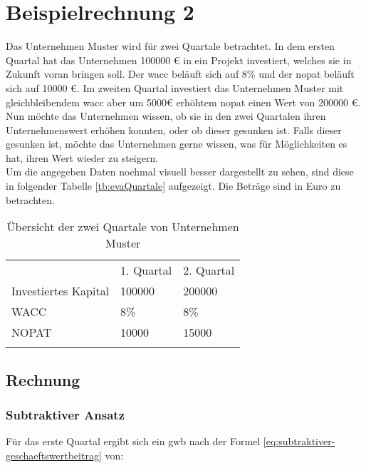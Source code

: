 \section{Beispielrechnung 2}

Das Unternehmen Muster wird für zwei Quartale betrachtet. In dem ersten Quartal hat das Unternehmen 100000 € in ein Projekt investiert, welches sie in Zukunft voran bringen soll. Der \ac{wacc} beläuft sich auf 8\% und der \ac{nopat} beläuft sich auf 10000 €. Im zweiten Quartal investiert das Unternehmen Muster mit gleichbleibendem \ac{wacc} aber um 5000€ erhöhtem \ac{nopat} einen Wert von 200000 €. Nun möchte das Unternehmen wissen, ob sie in den zwei Quartalen ihren Unternehmenswert erhöhen konnten, oder ob dieser gesunken ist. Falls dieser gesunken ist, möchte das Unternehmen gerne wissen, was für Möglichkeiten es hat, ihren Wert wieder zu steigern.\\
Um die angegeben Daten nochmal visuell besser dargestellt zu sehen, sind diese in folgender Tabelle \eqref{tb:evaQuartale} aufgezeigt. Die Beträge sind in Euro zu betrachten.

\bigskip
\begin{table}[!h]
    \begin{tabular}{lll}
        \cline{1-3} \rowcolor{gray}
                             & 1. Quartal & 2. Quartal \\ \cline{1-3} \rowcolor{white}
        Investiertes Kapital & 100000     & 200000     \\ \cline{1-3} \rowcolor{white}
        WACC                 & 8\%        & 8\%        \\ \cline{1-3} \rowcolor{white}
        NOPAT                & 10000      & 15000      \\ \cline{1-3} \rowcolor{white}
    \end{tabular}
    \caption{Übersicht der zwei Quartale von Unternehmen Muster}
    \label{tb:evaQuartale}
\end{table}

\subsection{Rechnung}

\subsubsection{Subtraktiver Ansatz}

Für das erste Quartal ergibt sich ein \ac{gwb} nach der Formel \eqref{eq:subtraktiver-geschaeftswertbeitrag} von:

